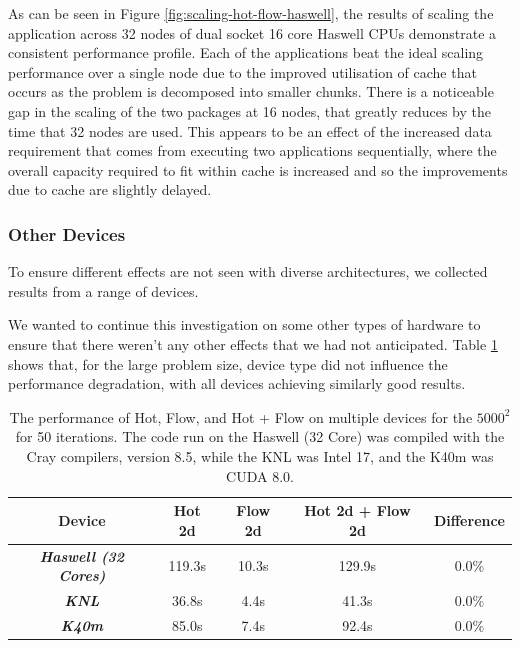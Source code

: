 \documentclass[runningheads,a4paper]{llncs}
\begin{document}
As can be seen in Figure \ref{fig:scaling-hot-flow-haswell}, the results of scaling the application across 32 nodes of dual socket 16 core Haswell CPUs demonstrate a consistent performance profile. Each of the applications beat the ideal scaling performance over a single node due to the improved utilisation of cache that occurs as the problem is decomposed into smaller chunks. There is a noticeable gap in the scaling of the two packages at 16 nodes, that greatly reduces by the time that 32 nodes are used. This appears to be an effect of the increased data requirement that comes from executing two applications sequentially, where the overall capacity required to fit within cache is increased and so the improvements due to cache are slightly delayed.

\subsubsection{Other Devices}

To ensure different effects are not seen with diverse architectures, we collected results from a range of devices.

We wanted to continue this investigation on some other types of hardware to ensure that there weren't any other effects that we had not anticipated. Table \ref{tab:hot-flow-multi-device} shows that, for the large problem size, device type did not influence the performance degradation, with all devices achieving similarly good results. 

\begin{table}[h]
  \begin{center}
    \begin{tabular}{c|c|c|c|c}
      \hline
      \textbf{Device} & \textbf{Hot 2d} & \textbf{Flow 2d} & \textbf{Hot 2d + Flow 2d} & \textbf{Difference} \\
      \hline
      \textit{\textbf{Haswell (32 Cores)}} & 119.3s & 10.3s & 129.9s & 0.0\% \\
      \textit{\textbf{KNL}} & 36.8s & 4.4s & 41.3s & 0.0\% \\
      \textit{\textbf{K40m}} & 85.0s & 7.4s & 92.4s & 0.0\% \\
    \end{tabular}
  \end{center}
  \caption{The performance of Hot, Flow, and Hot + Flow on multiple devices for the $5000^2$ for 50 iterations. The code run on the Haswell (32 Core) was compiled with the Cray compilers, version 8.5, while the KNL was Intel 17, and the K40m was CUDA 8.0.}
  \label{tab:hot-flow-multi-device}
\end{table}
\end{document}
